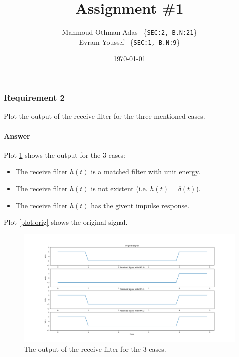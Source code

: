 \documentclass[
	12pt, %
	oneside
]{fphw}
\title{Assignment \#1} %
\author{Mahmoud Othman Adas ~\{\small{\texttt{SEC:2, B.N:21}\}} \\ 
Evram Youssef ~\{\small{\texttt{SEC:1, B.N:9}}\}} %
\date{\today} %
\institute{Cairo University \\ Computer Engineering} %
\begin{document}
\maketitle %

\setcounter{part}{1}
\part{}

\section*{Requirement 2}
\begin{problem}
	Plot the output of the receive filter for the three mentioned cases.
\end{problem}

\subsection*{Answer} 
Plot \ref{plot:out} shows the output for the 3 cases:
\begin{itemize}
	\item The receive filter $h(t)$ is a matched filter with unit energy.
	\item The receive filter $h(t)$ is not existent (i.e. $h(t) = \delta(t)$).
	\item The receive filter $h(t)$ has the givent impulse response.
\end{itemize}

Plot \ref{plot:orig} shows the original signal.

\begin{center}
	\begin{figure}
		\centering
		\includegraphics[scale=.26]{../graphs/out}
		\caption{The output of the receive filter for the 3 cases.}
		\label{plot:out}
	\end{figure}
\end{center}
\end{document}
